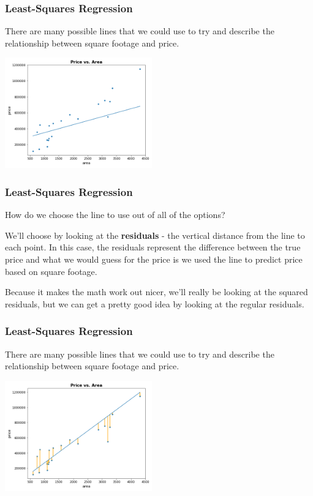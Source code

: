 \documentclass[11pt, table]{beamer}
\begin{document}
\begin{frame}
\frametitle{Least-Squares Regression}
There are many possible lines that we could use to try and describe the relationship between square footage and price.

\begin{center}
	\includegraphics[width=2.5in]{images/Appraisal_Values/ols_03.png}
\end{center}
\end{frame}

\begin{frame}
\frametitle{Least-Squares Regression}
How do we choose the line to use out of all of the options?
\vspace{0.1in}

We'll choose by looking at the \textbf{residuals} - the vertical distance from the line to each point. In this case, the residuals represent the difference between the true price and what we would guess for the price is we used the line to predict price based on square footage.
\vspace{0.1in}

Because it makes the math work out nicer, we'll really be looking at the squared residuals, but we can get a pretty good idea by looking at the regular residuals.
\end{frame}

\begin{frame}
\frametitle{Least-Squares Regression}
There are many possible lines that we could use to try and describe the relationship between square footage and price.

\begin{center}
	\includegraphics[width=2.5in]{images/Appraisal_Values/resid_01.png}
\end{center}
\end{frame}
\end{document}
